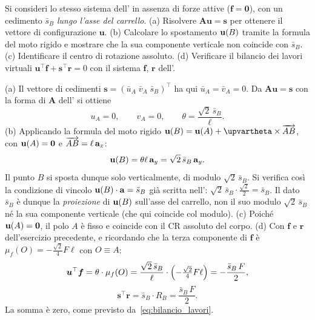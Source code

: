 \begin{esercizio}
	\label{ex:C05_trave_inclinata_cin}
	
	Si consideri lo stesso sistema dell'
	in assenza di forze attive ($\bm{f}=\bm{0}$), con un cedimento
	$\bar{s}_B$ \emph{lungo l'asse del carrello}.
	(a) Risolvere $\bm{A}\bm{u}=\bm{s}$ per ottenere il vettore di
	configurazione $\bm{u}$. (b) Calcolare lo spostamento $\mathbf{u}(B)$
	tramite la formula del moto rigido e mostrare che la sua
	componente verticale non coincide con $\bar{s}_B$.
	(c) Identificare il centro di rotazione assoluto.
	(d) Verificare il bilancio dei lavori virtuali
	$\bm{u}^\top\bm{f}+\bm{s}^\top\bm{r}=0$ con il sistema
	$\bm{f}$, $\bm{r}$ dell'.
	
	\risultato (a) Il vettore di cedimenti
	$\bm{s}=(\bar{u}_A\;\bar{v}_A\;\bar{s}_B)^\top$ ha qui
	$\bar{u}_A=\bar{v}_A=0$. Da $\bm{A}\bm{u}=\bm{s}$ con la forma di
	$\bm{A}$ dell' si ottiene
	\[
	u_A=0,\qquad v_A=0,\qquad
	\theta=\frac{\sqrt{2}\,\bar{s}_B}{\ell}.
	\]
	(b) Applicando la formula del moto rigido
	$\ub(B)=\ub(A)+\bm{\upvartheta}\times\overrightarrow{AB}$, con
	$\mathbf{u}(A)=\bm{0}$ e $\overrightarrow{AB}=\ell\,\mathbf{a}_x$:
	\[
	\mathbf{u}(B)=\theta\ell\,\mathbf{a}_y=\sqrt{2}\,\bar{s}_B\,\mathbf{a}_y.
	\]
	Il punto $B$ si sposta dunque solo verticalmente, di modulo
	$\sqrt{2}\,\bar{s}_B$. Si verifica così la condizione di
	vincolo $\mathbf{u}(B)\cdot\mathbf{a}=\bar{s}_B$ già scritta
	nell':
	$\sqrt{2}\,\bar{s}_B\cdot\tfrac{\sqrt{2}}{2}=\bar{s}_B$. Il dato
	$\bar{s}_B$ è dunque la \emph{proiezione} di $\mathbf{u}(B)$ sull'asse
	del carrello, non il suo modulo $\sqrt{2}\,\bar{s}_B$ né la sua
	componente verticale (che qui coincide col modulo).
	(c) Poiché $\mathbf{u}(A)=\bm{0}$, il polo $A$ è fisso e coincide con
	il CR assoluto del corpo.
	(d) Con $\bm{f}$ e $\bm{r}$ dell'esercizio precedente, e
	ricordando che la terza componente di $\bm{f}$ è
	$\mu_f(O)=-\tfrac{\sqrt{2}}{4}F\ell$ con $O\equiv A$:
	\[
	\bm{u}^\top\bm{f}
	= \theta\cdot\mu_f(O)
	= \frac{\sqrt{2}\,\bar{s}_B}{\ell}\cdot
	\Bigl(-\tfrac{\sqrt{2}}{4}F\ell\Bigr)
	= -\frac{\bar{s}_B\,F}{2},
	\]
	\[
	\bm{s}^\top\bm{r} = \bar{s}_B\cdot R_B = \frac{\bar{s}_B\,F}{2}.
	\]
	La somma è zero, come previsto da~\eqref{eq:bilancio_lavori}.
\end{esercizio}

